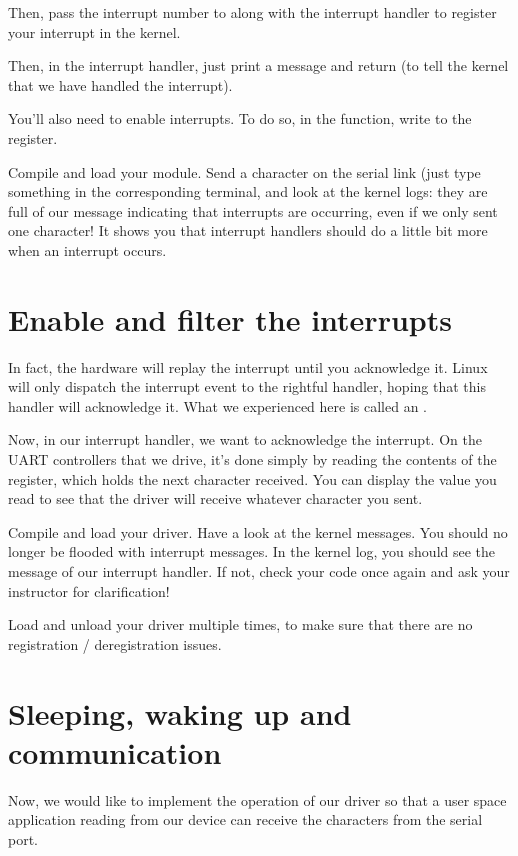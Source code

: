Then, pass the interrupt number to  along
with the interrupt handler to register your interrupt in the kernel.

Then, in the interrupt handler, just print a message and return
 (to tell the kernel that we have handled the
interrupt).

You'll also need to enable interrupts.
To do so, in the  function, write
 to the  register.

Compile and load your module. Send a character on the serial link (just
type something in the corresponding  terminal, and
look at the kernel logs: they are full of our message indicating that
interrupts are occurring, even if we only sent one character! It shows
you that interrupt handlers should do a little bit more when an
interrupt occurs.

\section{Enable and filter the interrupts}

In fact, the hardware will replay the interrupt until you acknowledge
it. Linux will only dispatch the interrupt event to the rightful
handler, hoping that this handler will acknowledge it. What we
experienced here is called an .

Now, in our interrupt handler, we want to acknowledge the
interrupt. On the UART controllers that we drive, it's done simply by
reading the contents of the  register, which holds the
next character received. You can display the value you read to see
that the driver will receive whatever character you sent.

Compile and load your driver. Have a look at the kernel messages. You
should no longer be flooded with interrupt messages. In the kernel
log, you should see the message of our interrupt handler. If not,
check your code once again and ask your instructor for clarification!

Load and unload your driver multiple times, to make sure that
there are no registration / deregistration issues.

\section{Sleeping, waking up and communication}

Now, we would like to implement the  operation of our
driver so that a user space application reading from our device can
receive the characters from the serial port.

